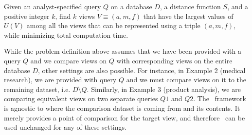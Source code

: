 \begin{problem}

Given an analyst-specified query $Q$ on a database $D$, a distance function $S$,
and a positive integer $k$, find $k$ views $V \equiv (a, m, f)$ that
have the largest values of $U(V)$ among all the views that can be represented
using a triple $(a, m, f)$, while minimizing total computation time.

\end{problem}

While the problem definition above
assumes that we have been provided with a query $Q$ and we compare views on $Q$
with corresponding views on the entire database $D$, other settings are also
possible. For instance, in Example 2 (medical research), we are provided with
query $Q$ and we must compare views on it to the remaining dataset, i.e.
$D$$\setminus$$Q$. Similarly, in Example 3 (product analysis), we are comparing
equivalent views on two separate queries $Q1$ and $Q2$. The \SeeDB\ framework is
agnostic to where the comparison dataset is coming from and its contents. It
merely provides a point of comparison for the target view, and therefore \SeeDB\
can be used unchanged for any of these settings.


